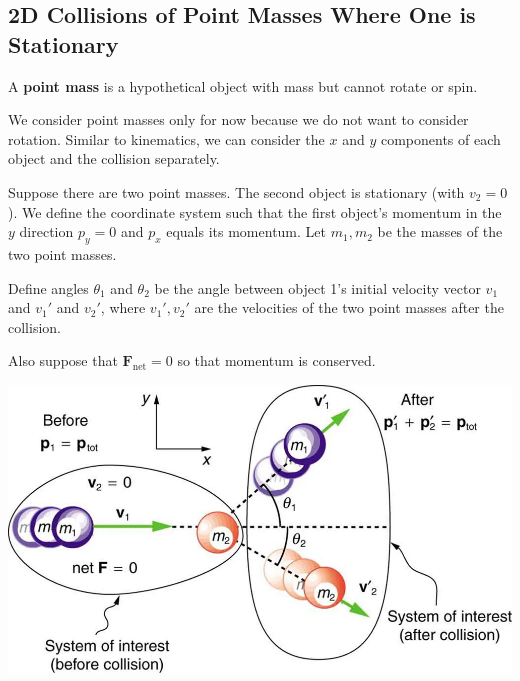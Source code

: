 \documentclass{article}
\newcommand{\definition}[1]{\begin{tcolorbox}[colback=red!5!white,colframe=red!75!black,parbox=false] #1 \end{tcolorbox}}
\begin{document}
\subsection{2D Collisions of Point Masses Where One is Stationary}

\definition{A \textbf{point mass} is a hypothetical object with mass but cannot rotate or spin.}

We consider point masses only for now because we do not want to consider rotation. Similar to kinematics, we can consider the $x$ and $y$ components of each object and the collision separately.

Suppose there are two point masses. The second object is stationary (with $v_2=0$). We define the coordinate system such that the first object's momentum in the $y$ direction $p_y=0$ and $p_x$ equals its momentum. Let $m_1,m_2$ be the masses of the two point masses.

Define angles $\theta_1$ and $\theta_2$ be the angle between object 1's initial velocity vector $v_1$ and $v_1'$ and $v_2'$, where $v_1',v_2'$ are the velocities of the two point masses after the collision.

Also suppose that $\mathbf{F}_ \text{net}=0$ so that momentum is conserved.

\begin{center}
	\includegraphics[width=0.8\linewidth]{2dcollision.png}
\end{center}
\end{document}
